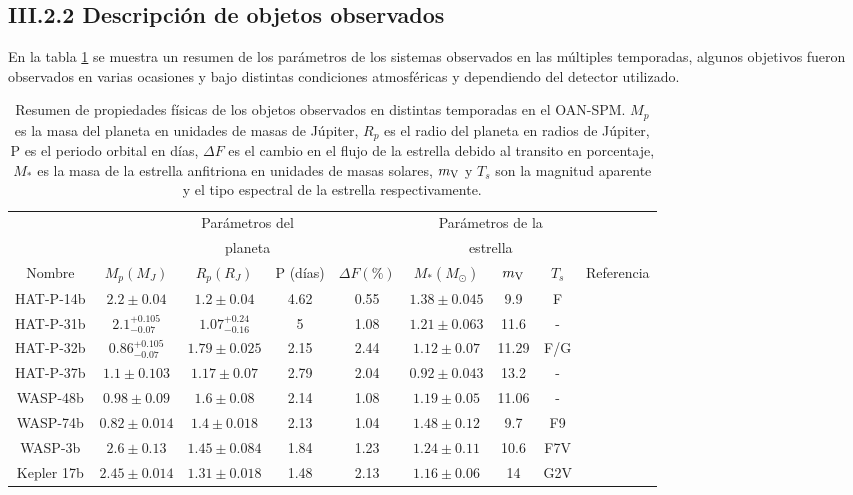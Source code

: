 \subsection*{III.2.2 Descripción de objetos observados}

En la tabla \ref{tab:tab_objetivos} se muestra un resumen de los parámetros de los sistemas observados en las múltiples temporadas, algunos objetivos fueron observados en varias ocasiones y bajo distintas condiciones atmosféricas y dependiendo del detector utilizado.

\begin{table}
\hspace{-1.7cm}
\begin{footnotesize}
\begin{tabular}{ccccccccc}
\hline 
 & \multicolumn{4}{c}{Parámetros del} & \multicolumn{3}{c}{Parámetros de la} &  \\
 & \multicolumn{4}{c}{planeta} & \multicolumn{3}{c}{estrella} & \\
\hline 
Nombre & $M_{p} (M_{J}) $ & $R_{p} (R_{J}) $ &  P (días) & $\Delta F (\%)$ & $M_{*} (M_{\odot})$ & $m_{\rm V}$ & $T_{s}$ & Referencia \\ 
\hline 
HAT-P-14b & $2.2\pm 0.04 $ & $1.2\pm 0.04 $ & 4.62 & 0.55 & $1.38\pm 0.045$ & 9.9 & F & \cite{torres2010hat} \\ 
HAT-P-31b & $2.1^{+0.105}_{-0.07} $ & $1.07^{+0.24}_{-0.16} $ & 5 & 1.08 & $1.21\pm 0.063$ & 11.6 & - & \cite{kipping2011hat} \\
HAT-P-32b & $0.86^{+0.105}_{-0.07} $ & $1.79\pm 0.025 $ & 2.15 & 2.44 & $1.12\pm 0.07$ & 11.29 & F/G & \cite{hartman2011hat} \\  
HAT-P-37b & $1.1\pm 0.103 $ & $1.17\pm 0.07 $ & 2.79 & 2.04 & $0.92\pm 0.043$ & 13.2 & - & \cite{bakos2012hat} \\
WASP-48b & $0.98\pm 0.09 $ & $1.6\pm 0.08 $ & 2.14 & 1.08 & $1.19\pm 0.05$ & 11.06 & - & \cite{enoch2011wasp} \\
WASP-74b & $0.82\pm 0.014 $ & $1.4\pm 0.018 $ & 2.13 & 1.04 & $1.48\pm 0.12$ & 9.7 & F9 & \cite{hellier2015three} \\
WASP-3b & $2.6\pm 0.13 $ & $1.45\pm 0.084 $ & 1.84 & 1.23 & $1.24\pm 0.11$ & 10.6 & F7V & \cite{pollacco2008wasp} \\
Kepler 17b & $2.45\pm 0.014 $ & $1.31\pm 0.018 $ & 1.48 & 2.13 & $1.16\pm 0.06$ & 14 & G2V & \cite{desert2011hot} \\
\hline 
\end{tabular} 
\end{footnotesize}
\caption{Resumen de propiedades físicas de los objetos observados en distintas temporadas en el OAN-SPM. $M_{p}$ es la masa del planeta en unidades de masas de Júpiter, $R_{p}$ es el radio del planeta en radios de Júpiter, P es el periodo orbital en días, $\Delta F$ es el cambio en el flujo de la estrella debido al transito en porcentaje, $M_{*}$ es la masa de la estrella anfitriona en unidades de masas solares, $m_{\rm V}$ y $T_{s}$ son la magnitud aparente y el tipo espectral de la estrella respectivamente.}
\label{tab:tab_objetivos}
\end{table}

